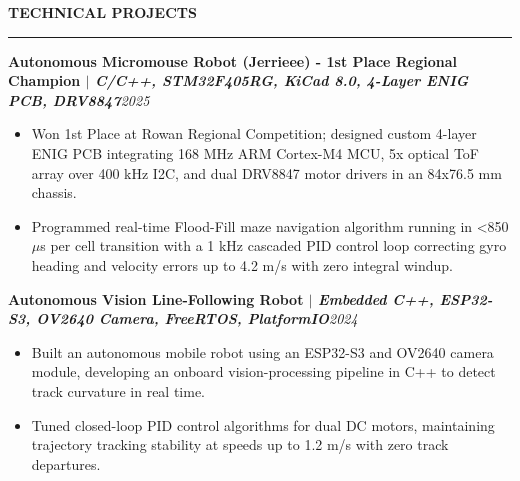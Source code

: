 \documentclass[10pt]{article}
\newcommand{\Section}[1]{%
  \vspace{4.0pt}%
  \textbf{\MakeUppercase{#1}}\par\vspace{-3.5pt}%
  \rule{\linewidth}{0.55pt}\par\vspace{2.5pt}%
}
\newcommand{\ProjectHeading}[2]{\noindent\textbf{#1}\hfill\textit{#2}\par}
\begin{document}
\vspace{2pt}
\Section{Technical Projects}
\ProjectHeading{Autonomous Micromouse Robot (Jerrieee) - 1st Place Regional Champion $|$ \emph{C/C++, STM32F405RG, KiCad 8.0, 4-Layer ENIG PCB, DRV8847}}{2025}
\begin{itemize}
  \item Won 1st Place at Rowan Regional Competition; designed custom 4-layer ENIG PCB integrating 168 MHz ARM Cortex-M4 MCU, 5x optical ToF array over 400 kHz I2C, and dual DRV8847 motor drivers in an 84x76.5 mm chassis.
  \item Programmed real-time Flood-Fill maze navigation algorithm running in <850 $\mu$s per cell transition with a 1 kHz cascaded PID control loop correcting gyro heading and velocity errors up to 4.2 m/s with zero integral windup.
\end{itemize}
\vspace{2pt}
\ProjectHeading{Autonomous Vision Line-Following Robot $|$ \emph{Embedded C++, ESP32-S3, OV2640 Camera, FreeRTOS, PlatformIO}}{2024}
\begin{itemize}
  \item Built an autonomous mobile robot using an ESP32-S3 and OV2640 camera module, developing an onboard vision-processing pipeline in C++ to detect track curvature in real time.
  \item Tuned closed-loop PID control algorithms for dual DC motors, maintaining trajectory tracking stability at speeds up to 1.2 m/s with zero track departures.
\end{itemize}
\vspace{2pt}
\end{document}
